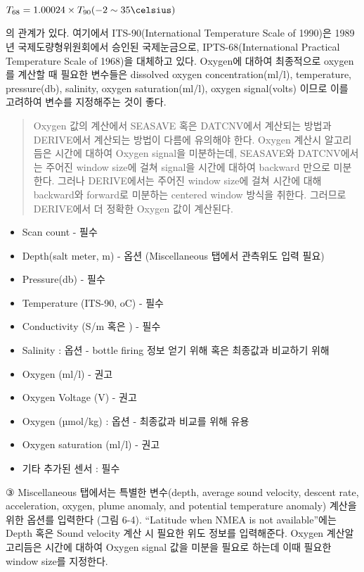 \documentclass[
]{book}
\providecommand{\tightlist}{%
  \setlength{\itemsep}{0pt}\setlength{\parskip}{0pt}}
\begin{document}
\(T_{68}=1.00024\times T_{90}(-2 \sim 35 \celsius)\)

의 관계가 있다. 여기에서 ITS-90(International Temperature Scale of 1990)은 1989년 국제도량형위원회에서 승인된 국제눈금으로, IPTS-68(International Practical Temperature Scale of 1968)을 대체하고 있다.
Oxygen에 대하여 최종적으로 oxygen를 계산할 때 필요한 변수들은 dissolved oxygen concentration(ml/l), temperature, pressure(db), salinity, oxygen saturation(ml/l), oxygen signal(volts) 이므로 이를 고려하여 변수를 지정해주는 것이 좋다.

\begin{quote}
Oxygen 값의 계산에서 SEASAVE 혹은 DATCNV에서 계산되는 방법과 DERIVE에서 계산되는 방법이 다름에 유의해야 한다. Oxygen 계산시 알고리듬은 시간에 대하여 Oxygen signal을 미분하는데, SEASAVE와 DATCNV에서는 주어진 window size에 걸쳐 signal을 시간에 대하여 backward 만으로 미분한다. 그러나 DERIVE에서는 주어진 window size에 걸쳐 시간에 대해 backward와 forward로 미분하는 centered window 방식을 취한다. 그러므로 DERIVE에서 더 정확한 Oxygen 값이 계산된다.
\end{quote}

\begin{itemize}
\tightlist
\item
  Scan count - 필수
\item
  Depth(salt meter, m) - 옵션 (Miscellaneous 탭에서 관측위도 입력 필요)
\item
  Pressure(db) - 필수
\item
  Temperature (ITS-90, oC) - 필수
\item
  Conductivity (S/m 혹은 ) - 필수
\item
  Salinity : 옵션 - bottle firing 정보 얻기 위해 혹은 최종값과 비교하기 위해
\item
  Oxygen (ml/l) - 권고
\item
  Oxygen Voltage (V) - 권고
\item
  Oxygen (µmol/kg) : 옵션 - 최종값과 비교를 위해 유용
\item
  Oxygen saturation (ml/l) - 권고
\item
  기타 추가된 센서 : 필수
\end{itemize}

③ Miscellaneous 탭에서는 특별한 변수(depth, average sound velocity, descent rate, acceleration, oxygen, plume anomaly, and potential temperature anomaly) 계산을 위한 옵션를 입력한다 (그림 6-4). ``Latitude when NMEA is not available''에는 Depth 혹은 Sound velocity 계산 시 필요한 위도 정보를 입력해준다. Oxygen 계산알고리듬은 시간에 대하여 Oxygen signal 값을 미분을 필요로 하는데 이때 필요한 window size를 지정한다.
\end{document}
